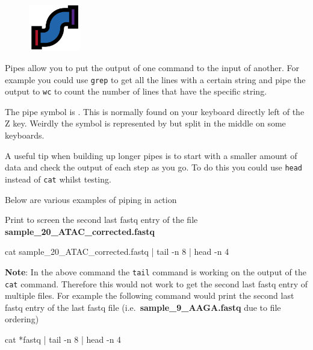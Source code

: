 \documentclass[
  letterpaper,
  DIV=11,
  numbers=noendperiod]{scrreprt}
\newenvironment{Shaded}{\begin{snugshade}}{\end{snugshade}}
\newcommand{\AttributeTok}[1]{\textcolor[rgb]{0.40,0.45,0.13}{#1}}
\newcommand{\FunctionTok}[1]{\textcolor[rgb]{0.28,0.35,0.67}{#1}}
\newcommand{\KeywordTok}[1]{\textcolor[rgb]{0.00,0.23,0.31}{#1}}
\newcommand{\NormalTok}[1]{\textcolor[rgb]{0.00,0.23,0.31}{#1}}
\newcommand{\PreprocessorTok}[1]{\textcolor[rgb]{0.68,0.00,0.00}{#1}}
\begin{document}
\begin{figure}

{\centering \includegraphics[width=0.2\textwidth,height=\textheight]{figures/pipes.png}

}

\end{figure}

Pipes allow you to put the output of one command to the input of
another. For example you could use \texttt{grep} to get all the lines
with a certain string and pipe the output to \texttt{wc} to count the
number of lines that have the specific string.

The pipe symbol is \texttt{\textbar{}}. This is normally found on your
keyboard directly left of the Z key. Weirdly the symbol is represented
by \texttt{\textbar{}} but split in the middle on some keyboards.

A useful tip when building up longer pipes is to start with a smaller
amount of data and check the output of each step as you go. To do this
you could use \texttt{head} instead of \texttt{cat} whilst testing.

Below are various examples of piping in action

Print to screen the second last fastq entry of the file
\textbf{sample\_20\_ATAC\_corrected.fastq}

\begin{Shaded}
\begin{Highlighting}[]
\FunctionTok{cat}\NormalTok{ sample\_20\_ATAC\_corrected.fastq }\KeywordTok{|} \FunctionTok{tail} \AttributeTok{{-}n}\NormalTok{ 8 }\KeywordTok{|} \FunctionTok{head} \AttributeTok{{-}n}\NormalTok{ 4 }
\end{Highlighting}
\end{Shaded}

\textbf{Note}: In the above command the \texttt{tail} command is working
on the output of the \texttt{cat} command. Therefore this would not work
to get the second last fastq entry of multiple files. For example the
following command would print the second last fastq entry of the last
fastq file (i.e.~\textbf{sample\_9\_AAGA.fastq} due to file ordering)

\begin{Shaded}
\begin{Highlighting}[]
\FunctionTok{cat} \PreprocessorTok{*}\NormalTok{fastq }\KeywordTok{|} \FunctionTok{tail} \AttributeTok{{-}n}\NormalTok{ 8 }\KeywordTok{|} \FunctionTok{head} \AttributeTok{{-}n}\NormalTok{ 4}
\end{Highlighting}
\end{Shaded}
\end{document}
